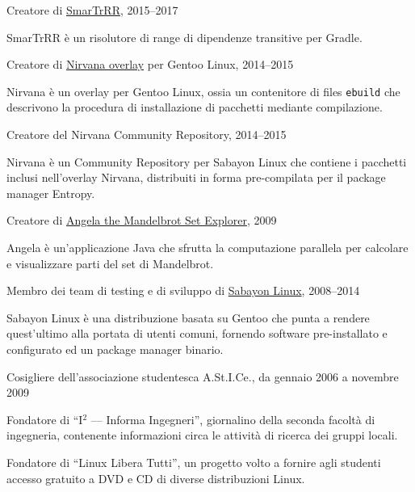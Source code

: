 \documentclass[10pt]{article}
\newenvironment{innerlist}[1][\enskip\textbullet]%
        {\begin{compactitem}[#1]}{\end{compactitem}}
\newcommand{\halfblankline}{\quad\vspace{-0.5\baselineskip}\pagebreak[3]}
\begin{document}
Creatore di \href{https://github.com/DanySK/SmarTrRR}{SmarTrRR}, 2015--2017
\begin{innerlist}
    \item SmarTrRR è un risolutore di range di dipendenze transitive per Gradle.
\end{innerlist}
\halfblankline

Creatore di \href{https://bitbucket.org/danysk/nirvana-overlay/}{Nirvana overlay} per Gentoo Linux, 2014--2015
\begin{innerlist}
    \item Nirvana è un overlay per Gentoo Linux, ossia un contenitore di files \texttt{ebuild} che descrivono la procedura di installazione di pacchetti mediante compilazione.
\end{innerlist}
\halfblankline

Creatore del {Nirvana Community Repository}, 2014--2015
\begin{innerlist}
    \item Nirvana è un Community Repository per Sabayon Linux che contiene i pacchetti inclusi nell'overlay Nirvana, distribuiti in forma pre-compilata per il package manager Entropy.
\end{innerlist}
\halfblankline

Creatore di \href{https://sourceforge.net/projects/mandelbrot/}{Angela the Mandelbrot Set Explorer}, 2009
\begin{innerlist}
  \item Angela è un'applicazione Java che sfrutta la computazione parallela per calcolare e visualizzare parti del set di Mandelbrot.
\end{innerlist}
\halfblankline

Membro dei team di testing e di sviluppo di \href{http://www.sabayon.org/}{Sabayon Linux}, 2008--2014
\begin{innerlist}
  \item Sabayon Linux è una distribuzione basata su Gentoo che punta a rendere quest'ultimo alla portata di utenti comuni, fornendo software pre-installato e configurato ed un package manager binario.
\end{innerlist}
\halfblankline

Cosigliere dell'associazione studentesca A.St.I.Ce., da gennaio 2006 a novembre 2009
    \begin{innerlist}
      \item Fondatore di ``I$^2$ --- Informa Ingegneri'', giornalino della seconda facoltà di ingegneria, contenente informazioni circa le attività di ricerca dei gruppi locali.
      \item Fondatore di ``Linux Libera Tutti'', un progetto volto a fornire agli studenti accesso gratuito a DVD e CD di diverse distribuzioni Linux.
    \end{innerlist}
\halfblankline
\end{document}
